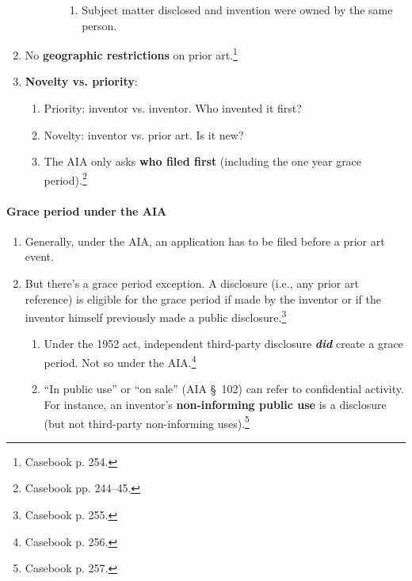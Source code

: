 \begin{enumerate}
\begin{enumerate}
\begin{enumerate}
\begin{enumerate}
                \item Subject matter disclosed and invention were owned by the 
                same person.
            \end{enumerate}
        \end{enumerate}
    \end{enumerate}
    \item No \textbf{geographic restrictions} on prior 
    art.\footnote{Casebook p. 254.}
    \item \textbf{Novelty vs. priority}:
    \begin{enumerate}
        \item Priority: inventor vs. inventor. Who invented it first?
        \item Novelty: inventor vs. prior art. Is it new?
        \item The AIA only asks \textbf{who filed first} (including the one 
        year grace period).\footnote{Casebook pp. 244--45.}
    \end{enumerate}
\end{enumerate}

\paragraph{Grace period under the AIA}

\begin{enumerate}
    \item Generally, under the AIA, an application has to be filed before a 
    prior art event.
    \item But there's a grace period exception. A disclosure (i.e., any prior 
    art reference) is eligible for the grace period if made by the inventor or 
    if the inventor himself previously made a public 
    disclosure.\footnote{Casebook p. 255.}
    \begin{enumerate}
        \item Under the 1952 act, independent third-party disclosure 
        \emph{\textbf{did}} create a grace period. Not so under the 
        AIA.\footnote{Casebook p. 256.}
        \item ``In public use'' or ``on sale'' (AIA \S\ 102) can refer to 
        confidential activity. For instance, an inventor's \textbf{non-informing 
        public use} is a disclosure (but not third-party non-informing 
        uses).\footnote{Casebook p. 257.}
    \end{enumerate}
\end{enumerate}

